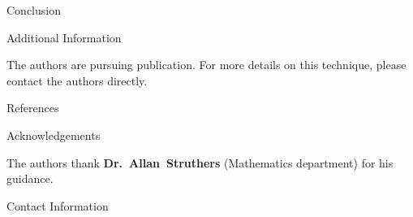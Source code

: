 \documentclass[final]{beamer}
\newlength{\onecolwid}
\begin{document}
\begin{frame}[t]
\begin{columns}[t]
\begin{column}{\onecolwid}
\begin{block}{Conclusion}
\end{block}


\begin{block}{Additional Information}

The authors are pursuing publication. For more details on this technique, please
contact the authors directly.

\end{block}


\begin{block}{References}

\nocite{*} %
\small{
\vspace{0.75in}}

\end{block}



\begin{block}{Acknowledgements}

The authors thank \textbf{Dr.~Allan~Struthers} (Mathematics
department) for his guidance.

\end{block}



\begin{block}{Contact Information}


\end{block}
\end{column}
\end{columns}
\end{frame}
\end{document}
